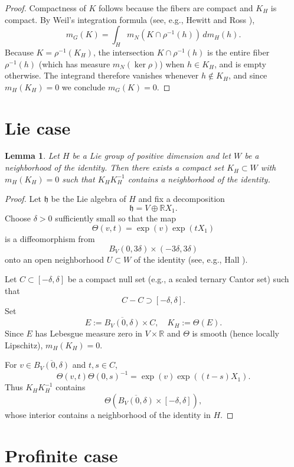 \documentclass[12pt]{amsart}
\newtheorem{lemma}{Lemma}
\begin{document}
\begin{proof}
Compactness of \(K\) follows because the fibers are compact and \(K_H\) is compact.
By Weil's integration formula (see, e.g., Hewitt and Ross \cite[\S 28]{HR}),
\[
m_G(K) = \int_H m_N(K \cap \rho^{-1}(h))\,dm_H(h).
\]
Because \(K = \rho^{-1}(K_H)\), the intersection \(K \cap \rho^{-1}(h)\) is the entire fiber \(\rho^{-1}(h)\) (which has measure \(m_N(\ker\rho)\)) when \(h \in K_H\), and is empty otherwise. The integrand therefore vanishes whenever \(h \notin K_H\), and since \(m_H(K_H)=0\) we conclude \(m_G(K)=0\).
\end{proof}

\section{Lie case}

\begin{lemma}
Let \(H\) be a Lie group of positive dimension and let \(W\)
be a neighborhood of the identity. Then there exists a compact set
\(K_H \subset W\) with \(m_H(K_H)=0\) such that \(K_HK_H^{-1}\)
contains a neighborhood of the identity.
\end{lemma}

\begin{proof}
Let \(\mathfrak{h}\) be the Lie algebra of \(H\) and fix a decomposition
\[
\mathfrak{h} = V \oplus \mathbb{R} X_1.
\]
Choose \(\delta>0\) sufficiently small so that the map
\[
\Theta(v,t) = \exp(v)\exp(tX_1)
\]
is a diffeomorphism from
\[
B_V(0,3\delta) \times (-3\delta,3\delta)
\]
onto an open neighborhood \(U \subset W\) of the identity (see, e.g., Hall \cite[Ch.~2]{Hall}).

Let \(C \subset [-\delta,\delta]\) be a compact null set (e.g., a scaled ternary Cantor set) such that
\[
C - C \supset [-\delta,\delta].
\]
Set
\[
E := \overline{B_V(0,\delta)} \times C, \quad K_H := \Theta(E).
\]
Since \(E\) has Lebesgue measure zero in \(V \times \mathbb{R}\) and \(\Theta\) is smooth (hence locally Lipschitz),
\(m_H(K_H)=0\).

For \(v \in \overline{B_V(0,\delta)}\) and \(t,s \in C\),
\[
\Theta(v,t)\Theta(0,s)^{-1}
= \exp(v)\exp((t-s)X_1).
\]
Thus \(K_HK_H^{-1}\) contains
\[
\Theta(\overline{B_V(0,\delta)} \times [-\delta,\delta]),
\]
whose interior contains a neighborhood of the identity in \(H\).
\end{proof}

\section{Profinite case}
\end{document}
